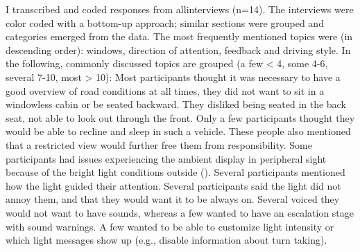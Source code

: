 I transcribed and coded responses from allinterviews (n=14). The interviews were color coded with a bottom-up approach; similar sections were grouped and categories emerged from the data. The most frequently mentioned topics were (in descending order): windows, direction of attention, feedback and driving style. In the following, commonly discussed topics are grouped (a few < 4, some 4-6, several 7-10, most > 10): Most participants thought it was necessary to have a good overview of road conditions at all times, they did not want to sit in a windowless cabin or be seated backward. They disliked being seated in the back seat, not able to look out through the front. Only a few participants thought they would be able to recline and sleep in such a vehicle. These people also mentioned that a restricted view would further free them from responsibility. Some participants had issues experiencing the ambient display in peripheral sight because of the bright light conditions outside (\emph{}). Several participants mentioned how the light guided their attention. Several participants said the light did not annoy them, and that they would want it to be always on. Several voiced they would not want to have sounds, whereas a few wanted to have an escalation stage with sound warnings. A few wanted to be able to customize light intensity or which light messages show up (e.g., disable information about turn taking).

